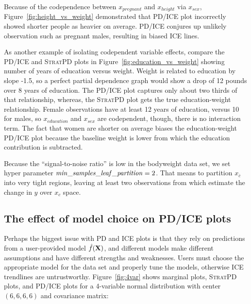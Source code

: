 \documentclass[12pt]{article}
\newcommand{\figref}[1]{Figure~\ref{#1}}
\newcommand{\cut}[1]{}
\newcommand{\spd}{\fontfamily{cmr}\textsc{\small StratPD}}
\newcommand{\xnc}{$x_{\overline{c}}$}
\begin{document}
\cut{
def toy_weight_data(n):
    df = pd.DataFrame()
    nmen = n//2
    nwomen = n//2
    df['sex'] = ['M']*nmen + ['F']*nwomen
    df.loc[df['sex']=='F','pregnant'] = np.random.randint(0,2,size=(nwomen,))
    df.loc[df['sex']=='M','pregnant'] = 0
    df.loc[df['sex']=='M','height'] = 5*12+8 + np.random.uniform(-7, +8, size=(nmen,))
    df.loc[df['sex']=='F','height'] = 5*12+5 + np.random.uniform(-4.5, +5, size=(nwomen,))
    df.loc[df['sex']=='M','education'] = 10 + np.random.randint(0,8,size=nmen)
    df.loc[df['sex']=='F','education'] = 12 + np.random.randint(0,8,size=nwomen)
}

Because of the codependence between $x_{pregnant}$ and $x_{height}$ via $x_{sex}$, \figref{fig:height_vs_weight} demonstrated that PD/ICE plot incorrectly showed shorter people as heavier on average. PD/ICE conjures up unlikely observation such as pregnant males, resulting in biased ICE lines.

As another example of isolating codependent variable effects, compare the PD/ICE and \spd{} plots in \figref{fig:education_vs_weight} showing number of years of education versus weight. Weight is related to education by slope -1.5, so a perfect partial dependence graph would show a drop of 12 pounds over 8 years of education. The PD/ICE plot captures only about two thirds of that relationship, whereas, the \spd{} plot gets the true education-weight relationship.  Female observations have at least 12 years of education, versus 10 for males, so $x_{education}$ and $x_{sex}$ are codependent, though, there is no interaction term. The fact that women are shorter on average biases the education-weight PD/ICE plot because the baseline weight is lower from which the education contribution is  subtracted.

Because the ``signal-to-noise ratio'' is low in the bodyweight data set, we set hyper parameter ${\it min\_samples\_leaf\_partition}=2$. That means to partition \xnc{} into very tight regions, leaving at least two observations from which estimate the change in $y$ over $x_c$ space.

\subsection{The effect of model choice on PD/ICE plots}

Perhaps the biggest issue with PD and ICE plots is that they rely on predictions from a user-provided model $\hat{f}(\bf X)$, and different models make different assumptions and have different strengths and weaknesses.  Users must choose the appropriate model for the data set and properly tune the models, otherwise ICE trendlines are untrustworthy. \figref{fig:4var} shows marginal plots, \spd{} plots, and PD/ICE plots for a 4-variable normal distribution with center $(6, 6, 6, 6)$ and covariance matrix:
\end{document}
